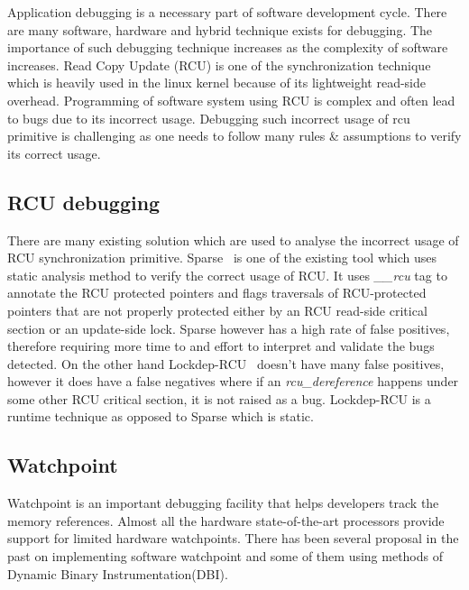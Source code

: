 Application debugging is a necessary part of software development cycle. There
are many software, hardware and hybrid technique exists for debugging. The
importance of such debugging technique increases as the complexity of software
increases. Read Copy Update (RCU) is one of the synchronization technique which
is heavily used in the linux kernel because of its lightweight read-side
overhead. Programming of software system using RCU is complex and often lead to
bugs due to its incorrect usage. Debugging such incorrect usage of rcu
primitive is challenging as one needs to follow many rules \& assumptions to
verify its correct usage. 

\subsection{RCU debugging} There are many existing solution which are used to
analyse the incorrect usage of RCU synchronization primitive.
Sparse~\cite{sparse} is one of the existing tool which uses static analysis
method to verify the correct usage of RCU. It uses \emph{\_\_rcu} tag to
annotate the RCU protected pointers and flags traversals of RCU-protected
pointers that are not properly protected either by an RCU read-side critical
section or an update-side lock. Sparse however has a high rate of false
positives, therefore requiring more time to and effort to interpret and
validate the bugs detected. On the other hand Lockdep-RCU~\cite{PaulEMcKenney2010LockdepRCU}
doesn't have many false positives, however it does have a false negatives
where if an \emph{rcu\_dereference} happens under some other RCU critical
section, it is not raised as a bug. Lockdep-RCU is a runtime technique
as opposed to Sparse which is static.

\subsection{Watchpoint} Watchpoint is an important debugging facility that
helps developers track the memory references. Almost all the hardware
state-of-the-art processors provide support for limited hardware watchpoints.
There has been several proposal in the past on implementing software watchpoint
and some of them using methods of Dynamic Binary Instrumentation(DBI).
